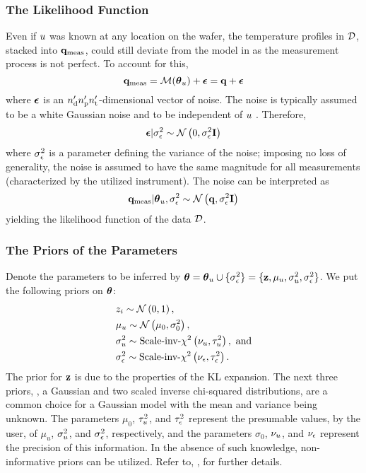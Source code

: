 \subsubsection{The Likelihood Function}
Even if $u$ was known at any location on the wafer, the temperature profiles in $\mathcal{D}$, stacked into $\mathbf{q}_{\text{meas}}$, could still deviate from the model in  as the measurement process is not perfect. To account for this,
\[
  \mvT_\meas = \model{\vparam_\u} + \vnoise = \mvT + \vnoise
\]
where $\boldsymbol\epsilon$ is an ${n_\text{d}'} {n_\text{p}'} {n_\text{t}'}$-dimensional vector of noise. The noise is typically assumed to be a white Gaussian noise and to be independent of $u$ \cite{rasmussen2006, marzouk2009}. Therefore,
\[
  \boldsymbol\epsilon | \sigma^2_\epsilon \sim \mathcal{N}\left( 0, \sigma^2_\epsilon \mathbf{I} \right)
\]
where $\sigma^2_\epsilon$ is a parameter defining the variance of the noise; imposing no loss of generality, the noise is assumed to have the same magnitude for all measurements (characterized by the utilized instrument). The noise can be interpreted as
\begin{equation} \elabel{likelihood}
  \mvT_\meas | \vparam_\u, \sigma_\noise^2 \sim \gaussian{\mvT}{\sigma_\noise^2 \mI}
\end{equation}
yielding the likelihood function of the data $\mathcal{D}$.

\subsubsection{The Priors of the Parameters}
Denote the parameters to be inferred by ${\boldsymbol\theta} = {\boldsymbol\theta}_u \cup \{ \sigma_\epsilon^2 \} = \{ \mathbf{z}, \mu_u, \sigma_u^2, \sigma_\epsilon^2 \}$. We put the following priors on ${\boldsymbol\theta}$:
\begin{align}
  & \z_i \sim \gaussian{0}{1}, \elabel{z-prior} \\
  & \mu_\u \sim \gaussian{\mu_0}{\sigma^2_0}, \elabel{mu-u-prior} \\
  & \sigma^2_\u \sim \sichisquared{\nu_\u}{\tau^2_\u}, \text{ and} \elabel{sigma2-u-prior} \\
  & \sigma^2_\noise \sim \sichisquared{\nu_\noise}{\tau^2_\noise}. \elabel{sigma2-noise-prior}
\end{align}
The prior for $\mathbf{z}$ is due to the properties of the KL expansion. The next three priors, \ie, a Gaussian and two scaled inverse chi-squared distributions, are a common choice for a Gaussian model with the mean and variance being unknown. The parameters $\mu_0$, $\tau^2_u$, and $\tau^2_\epsilon$ represent the presumable values, by the user, of $\mu_u$, $\sigma^2_u$, and $\sigma^2_\epsilon$, respectively, and the parameters $\sigma_0$, $\nu_u$, and $\nu_\epsilon$ represent the precision of this information. In the absence of such knowledge, non-informative priors can be utilized. Refer to, \eg, \cite{gelman2004, bernardo2007} for further details.

